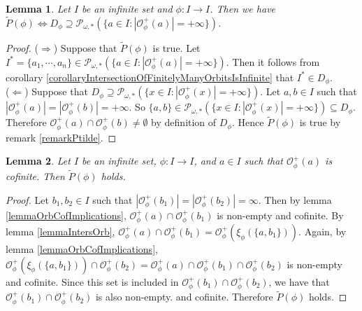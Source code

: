\documentclass[a4paper,11pt]{article}
\theoremstyle{plain}
\newtheorem{lemma}{Lemma}[section]
\theoremstyle{definition}
\theoremstyle{remark}
\begin{document}
\begin{lemma}
\label{lemmaCharacOfPTildeInTermsOfDPhi}
Let $I$ be an infinite set and $\phi : I \to I$. Then we have \\
$\widetilde{P}(\phi) \Leftrightarrow D_\phi \supseteq \mathcal{P}_{\omega,*}(\{a \in I : |\mathcal{O}^{+}_\phi(a)|=+\infty\})$.
\end{lemma}

\begin{proof}
($\Rightarrow$) Suppose that $\widetilde{P}(\phi)$ is true. Let $I^* = \{a_1,\cdots,a_n\} \in \mathcal{P}_{\omega,*}(\{a \in I : |\mathcal{O}^{+}_\phi(a)|=+\infty\})$. Then it follows from corollary \ref{corollaryIntersectionOfFinitelyManyOrbitsIsInfinite} that $I^* \in D_\phi$. \\
($\Leftarrow$) Suppose that $D_\phi \supseteq \mathcal{P}_{\omega,*}(\{x \in I : |\mathcal{O}^{+}_\phi(x)|=+\infty\})$. Let $a,b \in I$ such that $|\mathcal{O}^{+}_\phi(a)| = |\mathcal{O}^{+}_\phi(b)| = +\infty$. So $\{a,b\} \in \mathcal{P}_{\omega,*}(\{x \in I : |\mathcal{O}^{+}_\phi(x)|=+\infty\}) \subseteq D_\phi$. Therefore $\mathcal{O}^{+}_\phi(a) \cap \mathcal{O}^{+}_\phi(b) \neq \emptyset$ by definition of $D_\phi$. Hence $\widetilde{P}(\phi)$ is true by remark \ref{remarkPtilde}.
\end{proof}

\begin{lemma}
\label{lemmaOrbCofPtildeHolds}
Let $I$ be an infinite set, $\phi : I \to I$, and $a \in I$ such that $\mathcal{O}^{+}_\phi(a)$ is cofinite. Then $\widetilde{P}(\phi)$ holds.
\end{lemma}

\begin{proof}
Let $b_1,b_2 \in I$ such that $|\mathcal{O}^{+}_\phi(b_1)|=|\mathcal{O}^{+}_\phi(b_2)|=\infty$. Then by lemma \ref{lemmaOrbCofImplications}, $\mathcal{O}^{+}_\phi(a) \cap \mathcal{O}^{+}_\phi(b_1)$ is non-empty and cofinite. By lemma \ref{lemmaIntersOrb}, $\mathcal{O}^{+}_\phi(a) \cap \mathcal{O}^{+}_\phi(b_1) = \mathcal{O}^{+}_\phi(\xi_\phi(\{a,b_1\}))$. Again, by lemma \ref{lemmaOrbCofImplications}, $\mathcal{O}^{+}_\phi(\xi_\phi(\{a,b_1\})) \cap \mathcal{O}^{+}_\phi(b_2) = \mathcal{O}^{+}_\phi(a) \cap \mathcal{O}^{+}_\phi(b_1) \cap \mathcal{O}^{+}_\phi(b_2)$ is non-empty and cofinite. Since this set is included in $\mathcal{O}^{+}_\phi(b_1) \cap \mathcal{O}^{+}_\phi(b_2)$, we have that $\mathcal{O}^{+}_\phi(b_1) \cap \mathcal{O}^{+}_\phi(b_2)$ is also non-empty. and cofinite. Therefore $\widetilde{P}(\phi)$ holds.
\end{proof}
\end{document}
